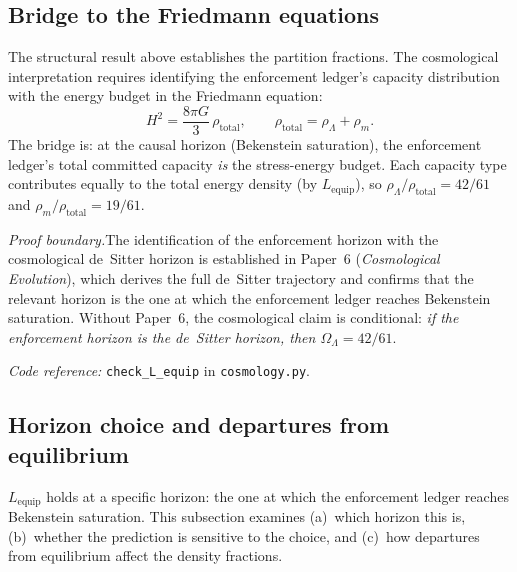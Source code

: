\documentclass[11pt,a4paper]{article}
\theoremstyle{definition}
\newcommand{\coderef}[2]{\smallskip\noindent\textit{Code reference:} \texttt{#1} in \texttt{#2}.}
\begin{document}
\subsection{Bridge to the Friedmann equations}
\label{sec:friedmann_bridge}

The structural result above establishes the partition fractions.  The
cosmological interpretation requires identifying the enforcement
ledger's capacity distribution with the energy budget in the Friedmann
equation:
\begin{equation}
  H^2 = \frac{8\pi G}{3}\,\rho_{\mathrm{total}},
  \qquad \rho_{\mathrm{total}} = \rho_\Lambda + \rho_m.
\end{equation}
The bridge is: at the causal horizon (Bekenstein saturation), the
enforcement ledger's total committed capacity \emph{is} the
stress-energy budget.  Each capacity type contributes equally to the
total energy density (by $L_{\mathrm{equip}}$), so
$\rho_\Lambda / \rho_{\mathrm{total}} = 42/61$ and
$\rho_m / \rho_{\mathrm{total}} = 19/61$.

\textit{Proof boundary.}\quad The identification of the enforcement
horizon with the cosmological de~Sitter horizon is established in
Paper~6 (\emph{Cosmological Evolution}), which derives the full
de~Sitter trajectory and confirms that the relevant horizon is the
one at which the enforcement ledger reaches Bekenstein saturation.
Without Paper~6, the cosmological claim is conditional: \emph{if the
enforcement horizon is the de~Sitter horizon, then
$\Omega_\Lambda = 42/61$}.

\coderef{check\_L\_equip}{cosmology.py}

\subsection{Horizon choice and departures from equilibrium}
\label{sec:horizon_sensitivity}

$L_{\mathrm{equip}}$ holds at a specific horizon: the one at which the
enforcement ledger reaches Bekenstein saturation.  This subsection
examines (a)~which horizon this is, (b)~whether the prediction is
sensitive to the choice, and (c)~how departures from equilibrium affect
the density fractions.
\end{document}
